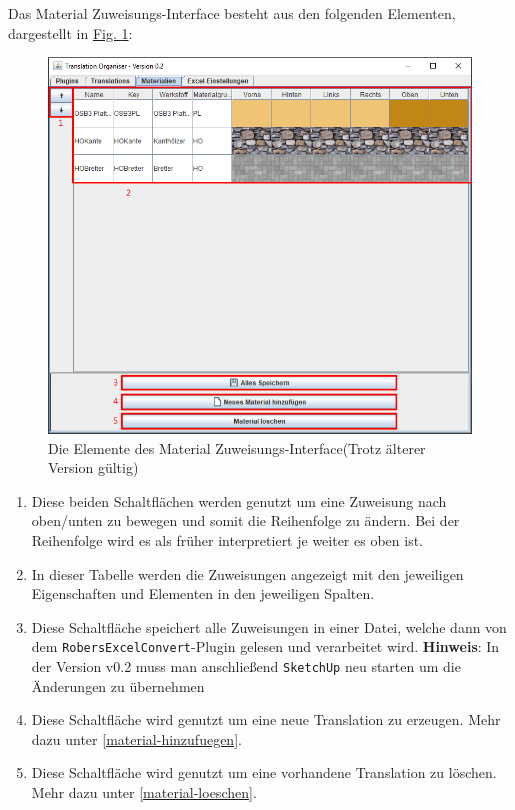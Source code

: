 \documentclass{book}
\newcommand{\sketchup}{\texttt{SketchUp}\xspace}
\newcommand{\robersexcelconvert}{\texttt{RobersExcelConvert}\xspace}
\newcommand{\hinweis}[1]{\newline \textbf{Hinweis}: #1 \newline}
\begin{document}
			Das Material Zuweisungs-Interface besteht aus den folgenden Elementen, dargestellt in \hyperref[fig:materials-normal]{Fig. \ref{fig:materials-normal}}:
			\begin{figure}
				\centering
				\includegraphics[scale=0.48]{pics/assisttool/materials-normal.png}
				\caption{Die Elemente des Material Zuweisungs-Interface\newline (Trotz älterer Version gültig)}
				\label{fig:materials-normal}
			\end{figure}
			
			\begin{enumerate}
				\item Diese beiden Schaltflächen werden genutzt um eine Zuweisung nach oben/unten zu bewegen und somit die Reihenfolge zu ändern. Bei der Reihenfolge wird es als früher interpretiert je weiter es oben ist.
				\item In dieser Tabelle werden die Zuweisungen angezeigt mit den jeweiligen Eigenschaften und Elementen in den jeweiligen Spalten.
				\item Diese Schaltfläche speichert alle Zuweisungen in einer Datei, welche dann von dem \robersexcelconvert-Plugin gelesen und verarbeitet wird.
				\hinweis{In der Version v0.2 muss man anschließend \sketchup neu starten um die Änderungen zu übernehmen}
				\item Diese Schaltfläche wird genutzt um eine neue Translation zu erzeugen. Mehr dazu unter \hyperref[material-hinzufuegen]{\ref{material-hinzufuegen}}.
				\item Diese Schaltfläche wird genutzt um eine vorhandene Translation zu löschen. Mehr dazu unter \hyperref[material-loeschen]{\ref{material-loeschen}}.
			\end{enumerate}
		
\end{document}
